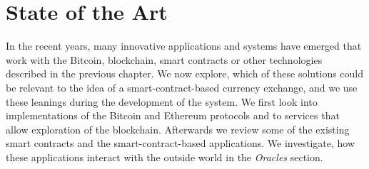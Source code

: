 \section{State of the Art}\label{sec:SOTA}
% 
In the recent years, many innovative applications and systems have emerged that work with the Bitcoin, blockchain, smart contracts or other technologies described in the previous chapter. We now explore, which of these solutions could be relevant to the idea of a smart-contract-based currency exchange, and we use these leanings during the development of the system. We first look into implementations of the Bitcoin and Ethereum protocols and to services that allow exploration of the blockchain. Afterwards we review some of the existing smart contracts and the smart-contract-based applications. We investigate, how these applications interact with the outside world in the \textit{Oracles} section. 


% 

% 

% 
% 
% 
